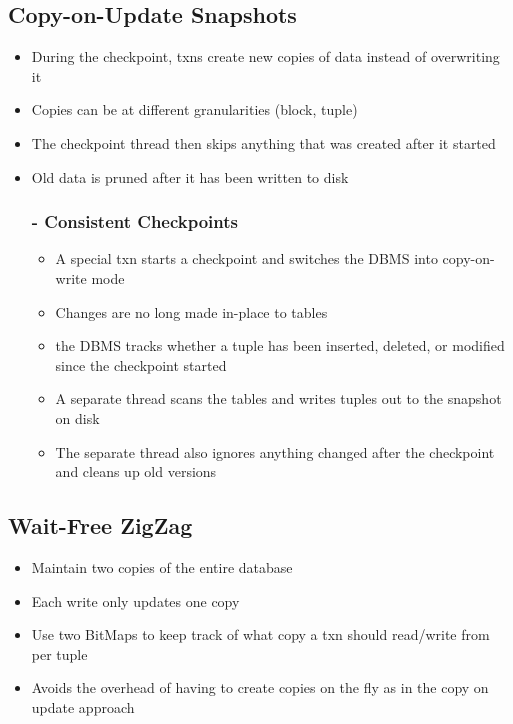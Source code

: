 \documentclass[11pt]{article}
\begin{document}
    \subsection*{Copy-on-Update Snapshots}
    \begin{itemize}
        \item During the checkpoint, txns create new copies of data instead of overwriting it
        \item Copies can be at different granularities (block, tuple)
        \item The checkpoint thread then skips anything that was created after it started
        \item Old data is pruned after it has been written to disk

        \subsubsection*{ - Consistent Checkpoints}
        \begin{itemize}
            \item A special txn starts a checkpoint and switches the DBMS into copy-on-write mode
            \item Changes are no long made in-place to tables
            \item the DBMS tracks whether a tuple has been inserted, deleted, or modified since the checkpoint started
            \item A separate thread scans the tables and writes tuples out to the snapshot on disk
            \item The separate thread also ignores anything changed after the checkpoint and cleans up old versions
        \end{itemize}
    \end{itemize}

    \subsection*{Wait-Free ZigZag}
    \begin{itemize}
        \item Maintain two copies of the entire database
        \item Each write only updates one copy
        \item Use two BitMaps to keep track of what copy a txn should read/write from per tuple
        \item Avoids the overhead of having to create copies on the fly as in the copy on update approach
    \end{itemize}
\end{document}

